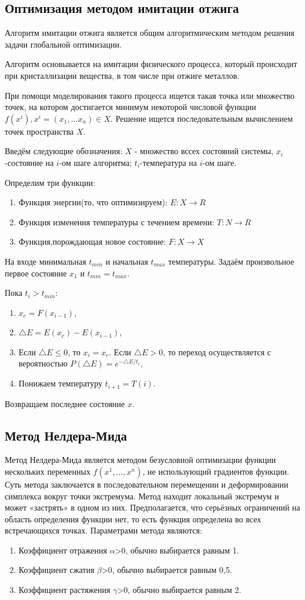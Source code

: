 \documentclass[11pt, oneside, a4paper]{article}
\begin{document}
\subsection{Оптимизация методом имитации отжига}
Алгоритм имитации отжига является общим алгоритмическим методом решения задачи глобальной оптимизации. 

Алгоритм основывается на имитации физического процесса, который происходит при кристаллизации вещества, в том числе при отжиге металлов.

При помощи моделирования такого процесса ищется такая точка или множество точек, на котором достигается минимум некоторой числовой функции $f(x^i),x^i=(x_1,...x_n)\in X$. Решение ищется последовательным вычислением точек пространства $X$\cite{fio_bib16}. 


Введём следующие обозначения: $X$ - множество вссех состояний системы, $x_i$-состояние на $i$-ом шаге алгоритма; $t_i$-температура на $i$-ом шаге.


Определим три функции:
\begin{enumerate}
\item Функция энергии(то, что оптимизируем):   $E:X\rightarrow R$
\item Функция изменения температуры с течением времени:  
$T:N\rightarrow R$
\item Функция,порождающая новое состояние:  
$F:X\rightarrow X$
\end{enumerate}
На входе минимальная $t_{min} $ и начальная $t_{max}$ температуры. Задаём произвольное первое состояние $x_1$ и $t_{min}=t_{max}$.

Пока $t_i>t_{min}$:
\begin{enumerate}
\item $x_c=F(x_{i-1})$,
\item $\triangle E=E(x_c)-E(x_{i-1})$,
\item Если $\triangle E \leq 0$, то $x_i=x_c$. Если $\triangle E >0$, то переход осуществляется с вероятностью $P(\triangle E)=e^{- \triangle E /t_i}$,
\item Понижаем температуру $t_{i+1}=T(i)$.
\end{enumerate}
Возвращаем последнее состояние $x$. 
\subsection{Метод Нелдера-Мида}
Метод Нелдера-Мида является методом безусловной оптимизации \cite{fio_bib19}функции нескольких  переменных $f(x^1,...,x^n )$, не использующий градиентов функции. Суть метода заключается в последовательном перемещении и деформировании симплекса вокруг точки экстремума. Метод находит локальный экстремум и может «застрять» в одном из них. Предполагается, что серьёзных ограничений на область определения функции нет, то есть функция определена во всех встречающихся точках.
Параметрами метода являются:
\begin{enumerate}
\item Коэффициент отражения $\alpha$>0, обычно выбирается равным 1.
\item Коэффициент сжатия $\beta$>0, обычно выбирается равным 0,5.
\item Коэффициент растяжения $\gamma$>0, обычно выбирается равным 2.
\end{enumerate}
\end{document}
